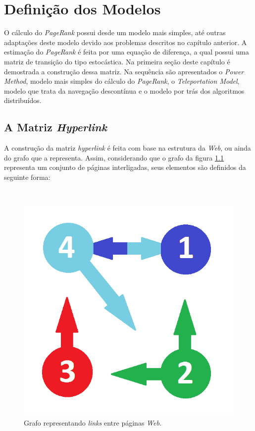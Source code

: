 \chapter{Definição dos Modelos}%

O cálculo do \textit{PageRank} possui desde um modelo mais simples, até outras adaptações deste modelo devido aos problemas descritos no capítulo anterior. A estimação do \textit{PageRank} é feita por uma equação de diferença, a qual possui uma matriz de transição do tipo estocástica. Na primeira seção deste capítulo é demostrada a construção dessa matriz. Na sequência são apresentados o \textit{Power Method}, modelo mais simples do cálculo do \textit{PageRank}, o \textit{Teleportation Model}, modelo que trata da navegação descontínua e o modelo por trás dos algoritmos distribuídos.   


\section{A Matriz \textit{Hyperlink}}%

A construção da matriz \textit{hyperlink} é feita com base na estrutura da \textit{Web}, ou ainda do grafo que a representa. Assim, considerando que o grafo da figura \ref{grafo} representa um conjunto de páginas interligadas, seus elementos são definidos da seguinte forma: 

\
\begin{figure}[!htb]
	\centering
	\includegraphics[scale=0.4]{imagens/grafo}
	\caption{Grafo representando \textit{links} entre páginas \textit{Web}.}
	\label{grafo}
\end{figure}

